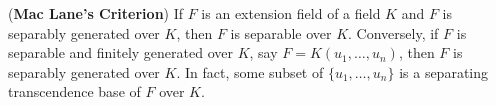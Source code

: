 (\textbf{Mac Lane's Criterion}) If $F$ is an extension field of a field $K$ and $F$ is separably generated over $K$, then $F$ is separable over $K$.
Conversely, if $F$ is separable and finitely generated over $K$, say $F = K(u_1, \ldots, u_n)$, then $F$ is separably generated over $K$. In fact, some subset of $\{u_1, \ldots, u_n\}$ is a separating transcendence base of $F$ over $K$.
